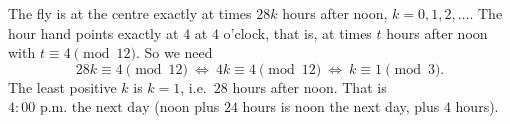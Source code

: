 The fly is at the centre exactly at times $28k$ hours after noon, $k=0,1,2,\dots$. The hour hand points exactly at $4$ at $4$ o'clock, that is, at times $t$ hours after noon with $t\equiv4\pmod{12}$. So we need
\[
28k\equiv4\pmod{12}\ \Longleftrightarrow\ 4k\equiv4\pmod{12}\ \Longleftrightarrow\ k\equiv1\pmod3 .
\]
The least positive $k$ is $k=1$, i.e.\ $28$ hours after noon. That is $\boxed{4{:}00\text{ p.m. the next day}}$ (noon plus $24$ hours is noon the next day, plus $4$ hours).
